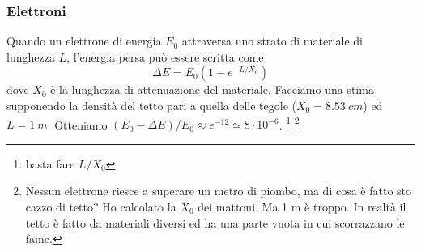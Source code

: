 \documentclass[a4paper]{article}
\begin{document}
\subsubsection*{Elettroni} 
Quando un elettrone di energia $E_0$ attraversa uno strato di materiale di lunghezza $L$, l'energia persa può essere scritta come 
\begin{equation}
\Delta E=E_0(1-e^{-L/X_0})  \label{Eres}
\end{equation}
dove $X_0$ è la lunghezza di attenuazione del materiale.
Facciamo una stima supponendo la densità del tetto pari a quella delle tegole ($X_0=\SI{8.53}{cm}$)
ed $L=\SI{1}{m}$. Otteniamo $(E_0-\Delta E)/E_0 \approx e^{-12} \simeq 8\cdot10^{-6}$. \footnote{basta fare $L/X_0$} 
\footnote{Nessun elettrone riesce a superare un metro di piombo, ma di cosa è fatto sto cazzo di tetto? Ho calcolato la $X_0$ dei mattoni. Ma 1 m è troppo. In realtà il tetto è fatto da materiali diversi ed ha una parte vuota in cui scorrazzano le faine.}



  
\end{document}
